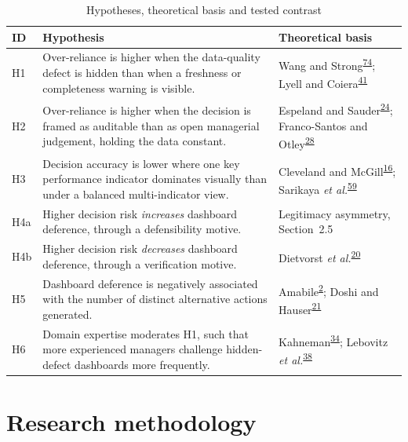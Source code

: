 \documentclass[11pt,a4paper]{article}
\numberwithin{figure}{section}
\numberwithin{table}{section}
\begin{document}
\begin{table}[H]
\centering\small
\caption{Hypotheses, theoretical basis and tested contrast}
\label{tab:hyp}
\begin{tabularx}{\textwidth}{@{}p{0.7cm} X p{3.6cm}@{}}
\toprule
\textbf{ID} & \textbf{Hypothesis} & \textbf{Theoretical basis} \\
\midrule
H1 & Over-reliance is higher when the data-quality defect is hidden than when a freshness or completeness
warning is visible. & Wang and Strong\textsuperscript{\hyperlink{ref74}{74}}; Lyell and Coiera\textsuperscript{\hyperlink{ref41}{41}} \\
H2 & Over-reliance is higher when the decision is framed as auditable than as open managerial judgement,
holding the data constant. & Espeland and Sauder\textsuperscript{\hyperlink{ref24}{24}}; Franco-Santos and Otley\textsuperscript{\hyperlink{ref28}{28}} \\
H3 & Decision accuracy is lower where one key performance indicator dominates visually than under a
balanced multi-indicator view. & Cleveland and McGill\textsuperscript{\hyperlink{ref16}{16}}; Sarikaya \emph{et al.}\textsuperscript{\hyperlink{ref59}{59}} \\
H4a & Higher decision risk \emph{increases} dashboard deference, through a defensibility motive. &
Legitimacy asymmetry, Section~2.5 \\
H4b & Higher decision risk \emph{decreases} dashboard deference, through a verification motive. &
Dietvorst \emph{et al.}\textsuperscript{\hyperlink{ref20}{20}} \\
H5 & Dashboard deference is negatively associated with the number of distinct alternative actions
generated. & Amabile\textsuperscript{\hyperlink{ref2}{2}}; Doshi and Hauser\textsuperscript{\hyperlink{ref21}{21}} \\
H6 & Domain expertise moderates H1, such that more experienced managers challenge hidden-defect dashboards
more frequently. & Kahneman\textsuperscript{\hyperlink{ref34}{34}}; Lebovitz \emph{et al.}\textsuperscript{\hyperlink{ref38}{38}} \\
\bottomrule
\end{tabularx}
\end{table}

\section{Research methodology}
\end{document}
